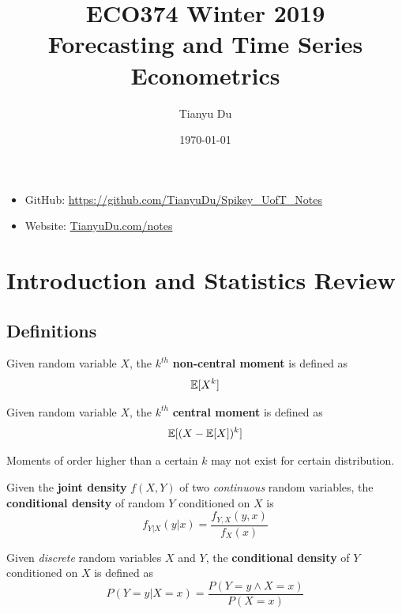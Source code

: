 \documentclass[11pt]{article}
\title{ECO374 Winter 2019 \\ Forecasting and Time Series Econometrics}
\date{\today}
\author{Tianyu Du}
\begin{document}
	\maketitle
	\doclicenseThis
	\begin{itemize}
		\item GitHub: \url{https://github.com/TianyuDu/Spikey_UofT_Notes}
		\item Website: \url{TianyuDu.com/notes}
	\end{itemize}
	\tableofcontents
	\newpage
	
	\section{Introduction and Statistics Review}
		\subsection{Definitions}
		\begin{definition}
			Given random variable $X$, the $k^{th}$ \textbf{non-central moment} is defined as
			\begin{equation}
				\mathbb{E}[{X^k}]
			\end{equation}
		\end{definition}
		
		\begin{definition}
			Given random variable $X$, the $k^{th}$ \textbf{central moment} is defined as
			\begin{equation}
				\mathbb{E}[{(X - \mathbb{E}[{X}])^k}]
			\end{equation}
		\end{definition}
		
		\begin{remark}
			Moments of order higher than a certain $k$ may not exist for certain distribution.
		\end{remark}
		
		\begin{definition}
			Given the \textbf{joint density} $f(X,Y)$ of two \emph{continuous} random variables, the \textbf{conditional density} of random $Y$ conditioned on $X$ is 
			\begin{equation}
				f_{Y|X}(y|x) = \frac{f_{Y,X}(y, x)}{f_X(x)}
			\end{equation}
		\end{definition}
		
		\begin{definition}
			Given \emph{discrete} random variables $X$ and $Y$, the \textbf{conditional density} of $Y$ conditioned on $X$ is defined as 
			\begin{equation}
				P(Y=y|X=x) = \frac{P(Y=y \land X=x)}{P(X=x)}
			\end{equation}
		\end{definition}
		
\end{document}
